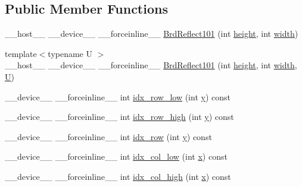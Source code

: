 \subsection*{Public Member Functions}
\begin{DoxyCompactItemize}
\item 
\-\_\-\-\_\-host\-\_\-\-\_\- \-\_\-\-\_\-device\-\_\-\-\_\- \-\_\-\-\_\-forceinline\-\_\-\-\_\- \hyperlink{structcv_1_1gpu_1_1device_1_1BrdReflect101_a1f92854b46d4cdd849286c4bdfc81863}{Brd\-Reflect101} (int \hyperlink{highgui__c_8h_adc7b4b8a6ef510e136071efbc9cd9a58}{height}, int \hyperlink{highgui__c_8h_a2474a5474cbff19523a51eb1de01cda4}{width})
\item 
{\footnotesize template$<$typename U $>$ }\\\-\_\-\-\_\-host\-\_\-\-\_\- \-\_\-\-\_\-device\-\_\-\-\_\- \-\_\-\-\_\-forceinline\-\_\-\-\_\- \hyperlink{structcv_1_1gpu_1_1device_1_1BrdReflect101_aeb3301c4b866ed3c6b9df994432fcb40}{Brd\-Reflect101} (int \hyperlink{highgui__c_8h_adc7b4b8a6ef510e136071efbc9cd9a58}{height}, int \hyperlink{highgui__c_8h_a2474a5474cbff19523a51eb1de01cda4}{width}, \hyperlink{core__c_8h_aa9c521f41af9a5191e5e4b6ffbae211a}{U})
\item 
\-\_\-\-\_\-device\-\_\-\-\_\- \-\_\-\-\_\-forceinline\-\_\-\-\_\- int \hyperlink{structcv_1_1gpu_1_1device_1_1BrdReflect101_ae1bd65c3c88e3fef0299e1a7bd6291a2}{idx\-\_\-row\-\_\-low} (int \hyperlink{highgui__c_8h_af1202c02b14870c18fb3a1da73e9e7c7}{y}) const 
\item 
\-\_\-\-\_\-device\-\_\-\-\_\- \-\_\-\-\_\-forceinline\-\_\-\-\_\- int \hyperlink{structcv_1_1gpu_1_1device_1_1BrdReflect101_a1bf5db9830a47f6ecf5c4078c53ee528}{idx\-\_\-row\-\_\-high} (int \hyperlink{highgui__c_8h_af1202c02b14870c18fb3a1da73e9e7c7}{y}) const 
\item 
\-\_\-\-\_\-device\-\_\-\-\_\- \-\_\-\-\_\-forceinline\-\_\-\-\_\- int \hyperlink{structcv_1_1gpu_1_1device_1_1BrdReflect101_a6e3bdd562ada6683b52eec47fb62cda2}{idx\-\_\-row} (int \hyperlink{highgui__c_8h_af1202c02b14870c18fb3a1da73e9e7c7}{y}) const 
\item 
\-\_\-\-\_\-device\-\_\-\-\_\- \-\_\-\-\_\-forceinline\-\_\-\-\_\- int \hyperlink{structcv_1_1gpu_1_1device_1_1BrdReflect101_a91cc3b6c8509fcd1bca14da218293c5e}{idx\-\_\-col\-\_\-low} (int \hyperlink{highgui__c_8h_a6150e0515f7202e2fb518f7206ed97dc}{x}) const 
\item 
\-\_\-\-\_\-device\-\_\-\-\_\- \-\_\-\-\_\-forceinline\-\_\-\-\_\- int \hyperlink{structcv_1_1gpu_1_1device_1_1BrdReflect101_ace0d2c1ac4bf76633a04a204ef6d0814}{idx\-\_\-col\-\_\-high} (int \hyperlink{highgui__c_8h_a6150e0515f7202e2fb518f7206ed97dc}{x}) const 

\end{DoxyCompactItemize}
